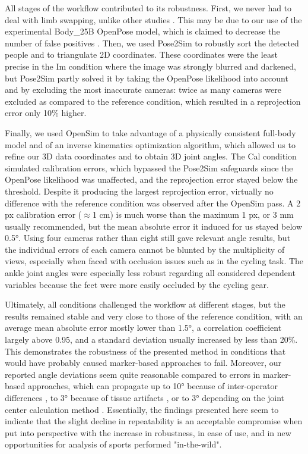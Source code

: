All stages of the workflow contributed to its robustness. First, we never had to deal with limb swapping, unlike other studies \cite{Nakano2019,Slembrouck2020}. This may be due to our use of the experimental Body\_25B OpenPose model, which is claimed to decrease the number of false positives \cite{Hidalgo2019}. Then, we used Pose2Sim to robustly sort the detected people and to triangulate 2D coordinates. These coordinates were the least precise in the Im condition where the image was strongly blurred and darkened, but Pose2Sim partly solved it by taking the OpenPose likelihood into account and by excluding the most inaccurate cameras: twice as many cameras were excluded as compared to the reference condition, which resulted in a reprojection error only 10\% higher.

Finally, we used OpenSim to take advantage of a physically consistent full-body model and of an inverse kinematics optimization algorithm, which allowed us to refine our 3D data coordinates and to obtain 3D joint angles. The Cal condition simulated calibration errors, which bypassed the Pose2Sim safeguards since the OpenPose likelihood was unaffected, and the reprojection error stayed below the threshold. Despite it producing the largest reprojection error, virtually no difference with the reference condition was observed after the OpenSim pass. A 2 px calibration error ($\approx$1 cm) is much worse than the maximum 1 px, or 3 mm usually recommended, but the mean absolute error it induced for us stayed below 0.5°.
\clearpage
Using four cameras rather than eight still gave relevant angle results, but the individual errors of each camera cannot be blunted by the multiplicity of views, especially when faced with occlusion issues such as in the cycling task. The ankle joint angles were especially less robust regarding all considered dependent variables because the feet were more easily occluded by the cycling gear.

Ultimately, all conditions challenged the workflow at different stages, but the results remained stable and very close to those of the reference condition, with an average mean absolute error mostly lower than 1.5°, a correlation coefficient largely above 0.95, and a standard deviation usually increased by less than 20\%. This demonstrates the robustness of the presented method in conditions that would have probably caused marker-based approaches to fail. Moreover, our reported angle deviations seem quite reasonable compared to errors in marker-based approaches, which can propagate up to 10° because of inter-operator differences \cite{Croce1999,Gorton2009}, to 3° because of tissue artifacts \cite{Benoit2015,Cappozzo1995}, or to 3° depending on the joint center calculation method \cite{Leboeuf2019}. Essentially, the findings presented here seem to indicate that the slight decline in repeatability is an acceptable compromise when put into perspective with the increase in robustness, in ease of use, and in new opportunities for analysis of sports performed "in-the-wild".

